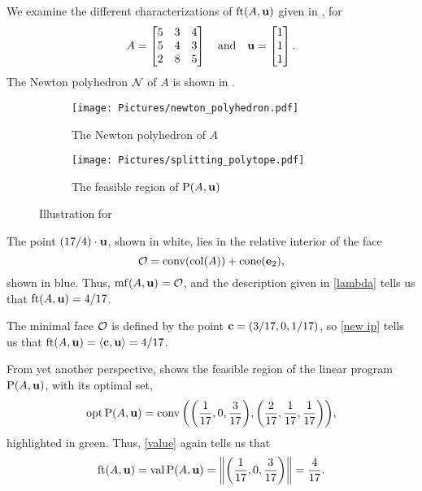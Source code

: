 \documentclass[11pt]{amsart}
\begin{document}
\begin{example}\label{ex: ft}
   We examine the different characterizations of $\operatorname{ft}(A, \mathbf{u})$ given in , for 
   \[A=\begin{bmatrix}5&3&4\\ 5&4&3\\ 2&8&5\end{bmatrix} \quad \text{and} \quad \mathbf{u} =
      \begin{bmatrix} 1 \\ 1\\ 1 \end{bmatrix}.\]
   The Newton polyhedron $\mathcal{N}$ of $A$ is shown in .
   \begin{figure}
   \centering
   \begin{subfigure}{.48\textwidth}
      \centering
      \texttt{[image: Pictures/newton\_polyhedron.pdf]}\\[1.4mm]
      \caption{The Newton polyhedron of $A$}
      \label{fig: newton polyhedron}
   \end{subfigure}
   \begin{subfigure}{.48\textwidth}
      \centering
      \texttt{[image: Pictures/splitting\_polytope.pdf]}
      \caption{The feasible region of $\mathrm{P}(A,\mathbf{u})$}
      \label{fig: splitting polytope}
   \end{subfigure}
      \caption{Illustration for }
   \label{fig: newton polyhedron and splitting polytope}
   \end{figure}
   The point $(17/4)\cdot \mathbf{u}$, shown in white, lies in the relative interior of the face
   \[\mathcal{O} = \operatorname{conv}(\operatorname{col}(A)) + \operatorname{cone}(\mathbf{e}_2),\]
   shown in blue. 
   Thus, $\operatorname{mf}(A,\mathbf{u}) = \mathcal{O}$, and the description given in \eqref{lambda} tells us that $\operatorname{ft}(A, \mathbf{u}) = 4/17$.

   The minimal face $\mathcal{O}$ is defined by the point $\mathbf{c} = (3/17, 0, 1/17)$, so \eqref{new ip} tells us that
   $\operatorname{ft}(A, \mathbf{u}) = \langle \mathbf{c}, \mathbf{u} \rangle = 4/17$.

   From yet another perspective,  shows the feasible region of the linear program $\mathrm{P}(A,\mathbf{u})$, with its optimal set,
   \[\operatorname{opt} \mathrm{P}(A,\mathbf{u}) = \operatorname{conv}\bigg(\bigg(\frac1{17}, 0, \frac3{17}\bigg),\bigg(\frac2{17}, \frac1{17}, \frac1{17}\bigg)\bigg),\]
   highlighted in green.
   Thus, \eqref{value} again tells us that
   \[\operatorname{ft}(A, \mathbf{u}) = \operatorname{val} \mathrm{P}(A,\mathbf{u}) = \bigg\|\bigg(\frac1{17}, 0, \frac3{17}\bigg)\bigg\| = \frac4{17}.\]
\end{example}
\end{document}
